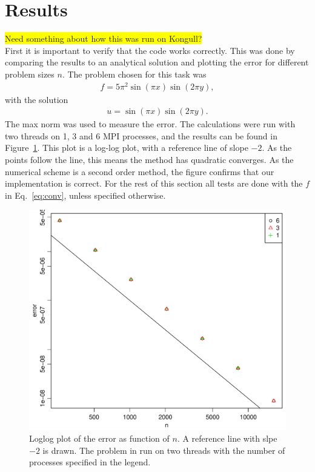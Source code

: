 \section{Results}
%
\colorbox{yellow}{Need something about how this was run on Kongull?}\\
First it is important to verify that the code works correctly. This was done by comparing the results to an analytical solution and plotting the error for different problem sizes $n$. The problem chosen for this task was 
\begin{align}
  \label{eq:conv} 
  f = 5 \pi^2 \sin (\pi x) \sin (2 \pi y),
\end{align}
with the solution
\begin{align}
  u = \sin (\pi x) \sin (2 \pi y). 
\end{align}
The max norm was used to measure the error. The calculations were run with two threads on 1, 3 and 6 MPI processes, and the results can be found in Figure~\ref{fig:errVsn}. This plot is a log-log plot, with a reference line of slope $-2$. As the points follow the line, this means the method has quadratic converges. As the numerical scheme is a second order method, the figure confirms that our implementation is correct. For the rest of this section all tests are done with the $f$ in Eq.~\eqref{eq:conv}, unless specified otherwise.\\
%
\begin{figure}[h!]
\begin{center}
    \includegraphics[scale=0.4]{./Figures/errVsn.pdf}
\end{center}
  \vspace{-1\baselineskip}
\caption{Loglog plot of the error as function of $n$. A reference line with slpe $-2$ is drawn. The problem in run on two threads with the number of processes specified in the legend.}
\label{fig:errVsn}
\end{figure}
